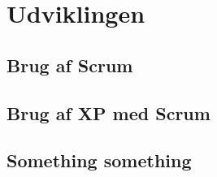 \chapter{Udviklingen}\label{ch:Udviklingen}


\section{Brug af Scrum}



\section{Brug af XP med Scrum}



\section{Something something}